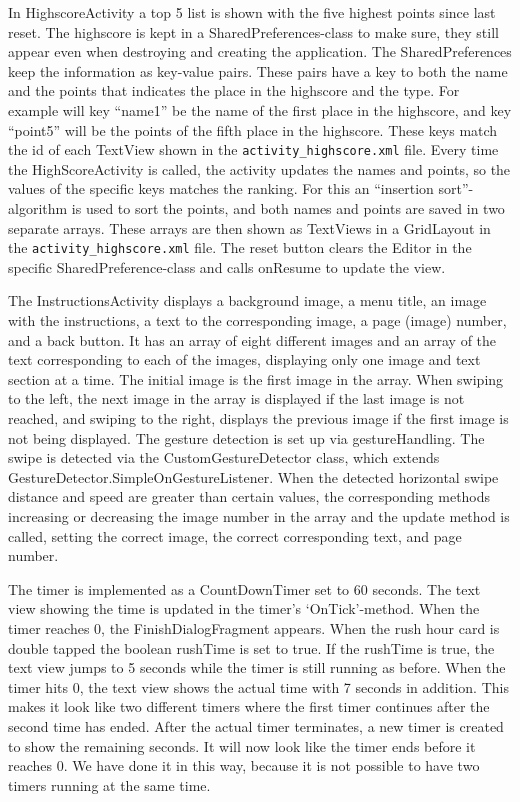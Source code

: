 In HighscoreActivity a top 5 list is shown with the five highest points since last reset. The highscore is kept in a SharedPreferences-class to make sure, they still appear even when destroying and creating the application. The SharedPreferences keep the information as key-value pairs. These pairs have a key to both the name and the points that indicates the place in the highscore and the type. For example will key “name1” be the name of the first place in the highscore, and key “point5” will be the points of the fifth place in the highscore. These keys match the id of each TextView shown in the \verb|activity_highscore.xml| file. Every time the HighScoreActivity is called, the activity updates the names and points, so the values of the specific keys matches the ranking. For this an “insertion sort”-algorithm is used to sort the points, and both names and points are saved in two separate arrays. These arrays are then shown as TextViews in a GridLayout in the \verb|activity_highscore.xml| file.
The reset button clears the Editor in the specific SharedPreference-class and calls onResume to update the view.  \newline

The InstructionsActivity displays a background image, a menu title, an image with the instructions, a text to the corresponding image, a page (image) number, and a back button. It has an array of eight different images and an array of the text corresponding to each of the images, displaying only one image and text section at a time. The initial image is the first image in the array. When swiping to the left, the next image in the array is displayed if the last image is not reached, and swiping to the right, displays the previous image if the first image is not being displayed. The gesture detection is set up via gestureHandling. The swipe is detected via the CustomGestureDetector class, which extends GestureDetector.SimpleOnGestureListener. When the detected horizontal swipe distance and speed are greater than certain values, the corresponding methods increasing or decreasing the image number in the array and the update method is called, setting the correct image, the correct corresponding text, and page number. \newline

The timer is implemented as a CountDownTimer set to 60 seconds. The text view showing the time is updated in the timer’s ‘OnTick’-method.  When the timer reaches 0, the FinishDialogFragment appears. When the rush hour card is double tapped the boolean rushTime is set to true. If the rushTime is true, the text view jumps to 5 seconds while the timer is still running as before. When the timer hits 0, the text view shows the actual time with 7 seconds in addition. This makes it look like two different timers where the first timer continues after the second time has ended. After the actual timer terminates, a new timer is created to show the remaining seconds. It will now look like the timer ends before it reaches 0. We have done it in this way, because it is not possible to have two timers running at the same time. 


